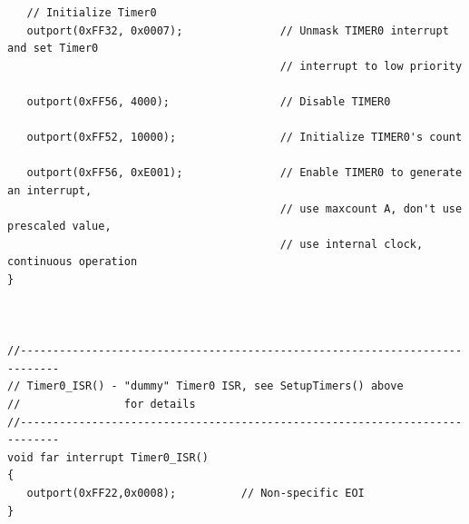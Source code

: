 \documentclass{article}	%
\begin{document}
\begin{verbatim}
   // Initialize Timer0
   outport(0xFF32, 0x0007);               // Unmask TIMER0 interrupt and set Timer0
                                          // interrupt to low priority

   outport(0xFF56, 4000);                 // Disable TIMER0

   outport(0xFF52, 10000);                // Initialize TIMER0's count

   outport(0xFF56, 0xE001);               // Enable TIMER0 to generate an interrupt,
                                          // use maxcount A, don't use prescaled value,
                                          // use internal clock, continuous operation
}



//----------------------------------------------------------------------------
// Timer0_ISR() - "dummy" Timer0 ISR, see SetupTimers() above
//                for details
//----------------------------------------------------------------------------
void far interrupt Timer0_ISR()
{
   outport(0xFF22,0x0008);          // Non-specific EOI
}
\end{verbatim}
\end{document}
